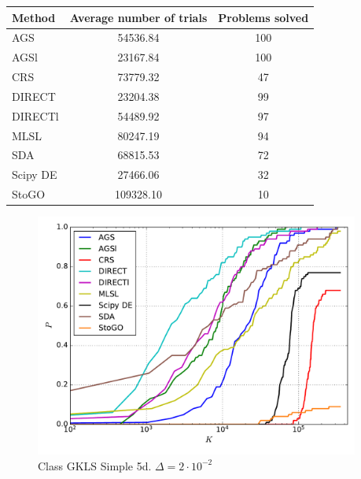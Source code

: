 \documentclass[a4paper]{article}
\begin{document}
\begin{tabular}{lcc}
\hline
 Method   &  Average number of trials  &  Problems solved  \\
\hline
 AGS      &          54536.84          &        100        \\
 AGSl     &          23167.84          &        100        \\
 CRS      &          73779.32          &        47         \\
 DIRECT   &          23204.38          &        99         \\
 DIRECTl  &          54489.92          &        97         \\
 MLSL     &          80247.19          &        94         \\
 SDA      &          68815.53          &        72         \\
 Scipy DE &          27466.06          &        32         \\
 StoGO    &         109328.10          &        10         \\
\hline
\end{tabular}
\begin{figure}[H]
  \center
  \includegraphics[width=0.95\textwidth]{../experiments/gklss5d/cmc.pdf}
  \caption{Class GKLS Simple 5d. $\Delta=2\cdot10^{-2}$}
\end{figure}
\end{document}
